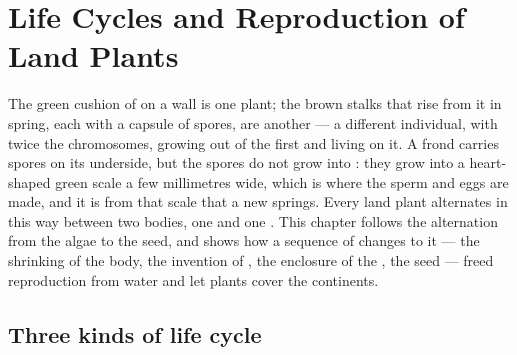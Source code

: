 \chapter{Life Cycles and Reproduction of Land Plants}\label{ch:b2:plant-life-cycles}

The green cushion of  on a wall is one plant; the brown stalks
that rise from it in spring, each with a capsule of spores, are
another --- a different individual, with twice the chromosomes,
growing out of the first and living on it. A  frond carries
spores on its underside, but the spores do not grow into : they
grow into a heart-shaped green scale a few millimetres wide, which
is where the sperm and eggs are made, and it is from that scale that
a new  springs. Every land plant alternates in this way between
two bodies, one  and one . This chapter follows the
alternation from the algae to the seed, and shows how a sequence of
changes to it --- the shrinking of the  body, the invention of
, the enclosure of the , the seed --- freed reproduction
from water and let plants cover the continents.

\section{Three kinds of life cycle}

